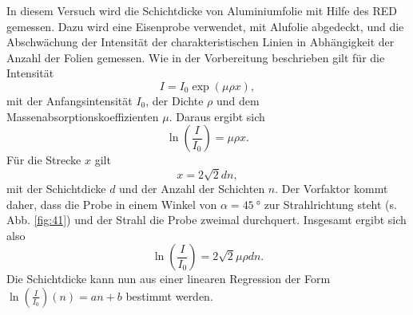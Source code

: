 In diesem Versuch wird die Schichtdicke von Aluminiumfolie mit Hilfe des RED gemessen. Dazu wird eine Eisenprobe verwendet, mit Alufolie abgedeckt, und die Abschwächung der Intensität der charakteristischen Linien in Abhängigkeit der Anzahl der Folien gemessen.
Wie in der Vorbereitung beschrieben gilt für die Intensität
\begin{equation}
 I = I_{0}\exp\left(\mu\rho x\right),
\end{equation}
mit der Anfangsintensität $I_{0}$, der Dichte $\rho$ und dem Massenabsorptionskoeffizienten $\mu$.
Daraus ergibt sich
\begin{equation}
 \ln\left(\frac{I}{I_{0}}\right) = \mu\rho x.
\end{equation}
Für die Strecke $x$ gilt
\begin{equation}
 x = 2\sqrt{2}dn,
\end{equation}
mit der Schichtdicke $d$ und der Anzahl der Schichten $n$. Der Vorfaktor kommt daher, dass die Probe in einem Winkel von $\alpha=\SI{45}{\degree}$ zur Strahlrichtung steht (s. Abb. \ref{fig:41}) und der Strahl die Probe zweimal durchquert. 
Insgesamt ergibt sich also
\begin{equation}
 \ln\left(\frac{I}{I_{0}}\right) = 2\sqrt{2}\mu\rho dn. 
\end{equation}
Die Schichtdicke kann nun aus einer linearen Regression der Form $\ln\left(\frac{I}{I_{0}}\right)(n) = an+b$ bestimmt werden.


